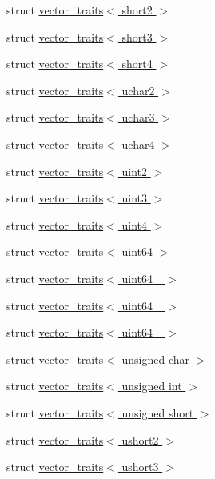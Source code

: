 \begin{DoxyCompactItemize}
struct \hyperlink{structcugar_1_1vector__traits_3_01short2_01_4}{vector\+\_\+traits$<$ short2 $>$}
\item 
struct \hyperlink{structcugar_1_1vector__traits_3_01short3_01_4}{vector\+\_\+traits$<$ short3 $>$}
\item 
struct \hyperlink{structcugar_1_1vector__traits_3_01short4_01_4}{vector\+\_\+traits$<$ short4 $>$}
\item 
struct \hyperlink{structcugar_1_1vector__traits_3_01uchar2_01_4}{vector\+\_\+traits$<$ uchar2 $>$}
\item 
struct \hyperlink{structcugar_1_1vector__traits_3_01uchar3_01_4}{vector\+\_\+traits$<$ uchar3 $>$}
\item 
struct \hyperlink{structcugar_1_1vector__traits_3_01uchar4_01_4}{vector\+\_\+traits$<$ uchar4 $>$}
\item 
struct \hyperlink{structcugar_1_1vector__traits_3_01uint2_01_4}{vector\+\_\+traits$<$ uint2 $>$}
\item 
struct \hyperlink{structcugar_1_1vector__traits_3_01uint3_01_4}{vector\+\_\+traits$<$ uint3 $>$}
\item 
struct \hyperlink{structcugar_1_1vector__traits_3_01uint4_01_4}{vector\+\_\+traits$<$ uint4 $>$}
\item 
struct \hyperlink{structcugar_1_1vector__traits_3_01uint64_01_4}{vector\+\_\+traits$<$ uint64 $>$}
\item 
struct \hyperlink{structcugar_1_1vector__traits_3_01uint64__2_01_4}{vector\+\_\+traits$<$ uint64\+\_ $>$}
\item 
struct \hyperlink{structcugar_1_1vector__traits_3_01uint64__3_01_4}{vector\+\_\+traits$<$ uint64\+\_ $>$}
\item 
struct \hyperlink{structcugar_1_1vector__traits_3_01uint64__4_01_4}{vector\+\_\+traits$<$ uint64\+\_ $>$}
\item 
struct \hyperlink{structcugar_1_1vector__traits_3_01unsigned_01char_01_4}{vector\+\_\+traits$<$ unsigned char $>$}
\item 
struct \hyperlink{structcugar_1_1vector__traits_3_01unsigned_01int_01_4}{vector\+\_\+traits$<$ unsigned int $>$}
\item 
struct \hyperlink{structcugar_1_1vector__traits_3_01unsigned_01short_01_4}{vector\+\_\+traits$<$ unsigned short $>$}
\item 
struct \hyperlink{structcugar_1_1vector__traits_3_01ushort2_01_4}{vector\+\_\+traits$<$ ushort2 $>$}
\item 
struct \hyperlink{structcugar_1_1vector__traits_3_01ushort3_01_4}{vector\+\_\+traits$<$ ushort3 $>$}

\end{DoxyCompactItemize}
